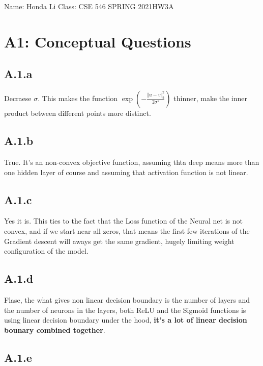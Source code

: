 \documentclass[]{article}
\begin{document}
\begin{center}
    Name: Honda Li \quad Class: CSE 546 SPRING 2021\quad HW3A
\end{center}

\section*{A1: Conceptual Questions}
    \subsection*{A.1.a}
        Decraese $\sigma$. This makes the function $\exp\left(
            - \frac{\Vert u - v\Vert_2^2}{2\sigma^2} 
        \right)$ thinner, make the inner product between different points more distinct. 
    \subsection*{A.1.b}
        True. It's an non-convex objective function, assuming thta deep means more than one hidden layer of course and assuming that activation function is not linear. 
    \subsection*{A.1.c}
        Yes it is. This ties to the fact that the Loss function of the Neural net is not convex, and if we start near all zeros, that means the first few iterations of the Gradient descent will aways get the same gradient, hugely limiting weight configuration of the model.
    \subsection*{A.1.d}
        Flase, the what gives non linear decision boundary is the number of layers and the number of neurons in the layers, both ReLU and the Sigmoid functions is using linear decision boundary under the hood, \textbf{it's a lot of linear decision bounary combined together}. 
    \subsection*{A.1.e}
        
\end{document}
